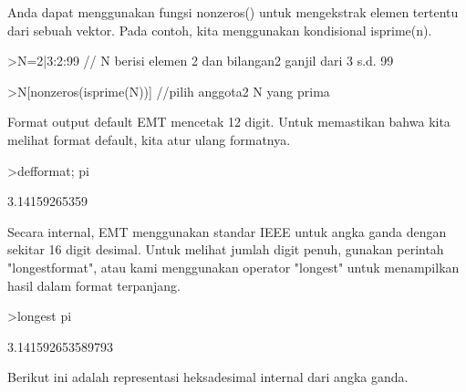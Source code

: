 \documentclass[a4paper,10pt]{article}
\begin{document}
\begin{eulernotebook}
\begin{eulercomment}
Anda dapat menggunakan fungsi nonzeros() untuk mengekstrak elemen
tertentu dari sebuah vektor. Pada contoh, kita menggunakan kondisional
isprime(n).
\end{eulercomment}
\begin{eulerprompt}
>N=2|3:2:99 // N berisi elemen 2 dan bilangan2 ganjil dari 3 s.d. 99
\end{eulerprompt}
\begin{euleroutput}
  [2,  3,  5,  7,  9,  11,  13,  15,  17,  19,  21,  23,  25,  27,  29,
  31,  33,  35,  37,  39,  41,  43,  45,  47,  49,  51,  53,  55,  57,
  59,  61,  63,  65,  67,  69,  71,  73,  75,  77,  79,  81,  83,  85,
  87,  89,  91,  93,  95,  97,  99]
\end{euleroutput}
\begin{eulerprompt}
>N[nonzeros(isprime(N))] //pilih anggota2 N yang prima
\end{eulerprompt}
\begin{euleroutput}
  [2,  3,  5,  7,  11,  13,  17,  19,  23,  29,  31,  37,  41,  43,  47,
  53,  59,  61,  67,  71,  73,  79,  83,  89,  97]
\end{euleroutput}
\begin{eulercomment}
Format output default EMT mencetak 12 digit. Untuk memastikan bahwa
kita melihat format default, kita atur ulang formatnya.
\end{eulercomment}
\begin{eulerprompt}
>defformat; pi
\end{eulerprompt}
\begin{euleroutput}
  3.14159265359
\end{euleroutput}
\begin{eulercomment}
Secara internal, EMT menggunakan standar IEEE untuk angka ganda dengan
sekitar 16 digit desimal. Untuk melihat jumlah digit penuh, gunakan
perintah "longestformat", atau kami menggunakan operator "longest"
untuk menampilkan hasil dalam format terpanjang.
\end{eulercomment}
\begin{eulerprompt}
>longest pi
\end{eulerprompt}
\begin{euleroutput}
        3.141592653589793 
\end{euleroutput}
\begin{eulercomment}
Berikut ini adalah representasi heksadesimal internal dari angka
ganda.
\end{eulercomment}

\end{eulernotebook}
\end{document}
